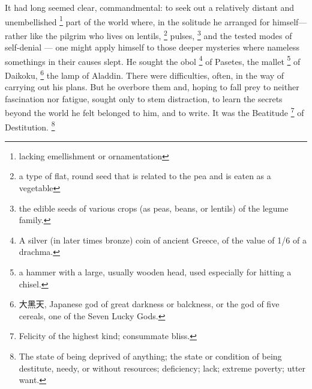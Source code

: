   It had long seemed clear, commandmental: to seek out a relatively distant and
unembellished 
\footnote{lacking emellishment or ornamentation}
part of the world where, in the solitude he arranged for
himself—rather like the pilgrim who lives on lentils, 
\footnote{a type of flat, round seed that is related to the pea and is eaten as
a vegetable}
pulses, 
\footnote{the edible seeds of various crops (as peas, beans, or lentils) of the
legume family.}
and the tested modes of self-denial --- one might apply himself to those deeper 
mysteries where nameless somethings in their causes slept. He sought the obol 
\footnote{A silver (in later times bronze) coin of ancient Greece, of the value
of 1/6 of a drachma. }
of Pasetes, the
mallet 
\footnote{a hammer with a large, usually wooden head, used especially for
hitting a chisel.}
of Daikoku, 
\footnote{大黑天, Japanese god of great darkness or balckness, or the god of 
five cereals, one of the Seven Lucky Gods.}
the lamp of Aladdin. There were difficulties, often, in the
way of carrying out his plans. But he overbore them and, hoping to fall prey to
neither fascination nor fatigue, sought only to stem distraction, to learn the
secrets beyond the world he felt belonged to him, and to write. It was the
Beatitude 
\footnote{Felicity of the highest kind; consummate bliss.}
of Destitution.
\footnote{The state of being deprived of anything; the state or condition of
being destitute, needy, or without resources; deficiency; lack; extreme poverty;
utter want.}

